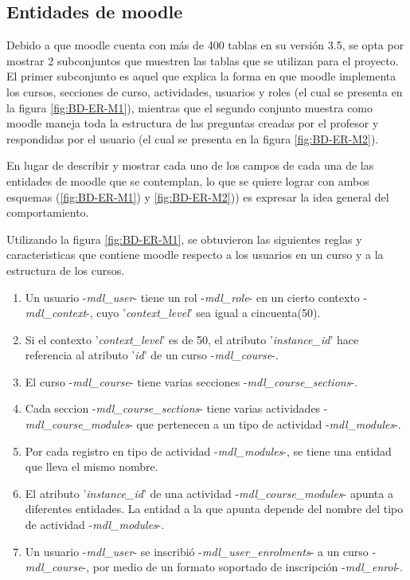 
\subsection{Entidades de moodle}

Debido a que moodle cuenta con más de 400 tablas en su versión 3.5, se opta
por mostrar 2 subconjuntos que muestren las tablas que se utilizan para el proyecto.\\

\noindent El primer subconjunto es aquel que explica la forma en que moodle implementa los cursos, 
secciones de curso, actividades, usuarios y roles (el cual se presenta en la figura \ref{fig:BD-ER-M1}), 
mientras que el segundo conjunto muestra como moodle maneja toda la 
estructura de las preguntas creadas por el profesor y respondidas por el usuario
(el cual se presenta en la figura \ref{fig:BD-ER-M2}).  



En lugar de describir y mostrar cada uno de los campos de cada una de las entidades de moodle que se contemplan,
lo que se quiere lograr con ambos esquemas (\ref{fig:BD-ER-M1}) y \ref{fig:BD-ER-M2}))
es expresar la idea general del comportamiento.

\clearpage
{}


\noindent Utilizando la figura \ref{fig:BD-ER-M1}, se obtuvieron las siguientes reglas y caracteristicas que contiene moodle respecto a los usuarios en un curso y a la estructura de los cursos.
\begin{enumerate}
    \item Un usuario -{\it mdl\_user}- tiene un rol -{\it mdl\_role}- en un cierto contexto -{\it mdl\_context}-, cuyo  '{\it context\_level}' sea igual a cincuenta(50).
    \item Si el contexto '{\it context\_level}' es de 50, el atributo '{\it instance\_id}' hace referencia al atributo '{\it id}' de un curso -{\it mdl\_course}-.
    \item El curso -{\it mdl\_course}- tiene varias secciones -{\it mdl\_course\_sections}-.
    \item Cada seccion -{\it mdl\_course\_sections}- tiene varias actividades -{\it mdl\_course\_modules}- que pertenecen a un tipo de actividad -{\it mdl\_modules}-.
    \item Por cada registro en tipo de actividad -{\it mdl\_modules}-, se tiene una entidad que lleva el mismo nombre.
    \item El atributo '{\it instance\_id}' de una actividad  -{\it mdl\_course\_modules}- apunta a diferentes entidades. La entidad a la que apunta depende del nombre del tipo de actividad -{\it mdl\_modules}-.
    \item Un usuario -{\it mdl\_user}- se inscribió -{\it mdl\_user\_enrolments}- a un curso -{\it mdl\_course}-, por medio de un formato soportado de inscripción -{\it mdl\_enrol}-.
\end{enumerate}

